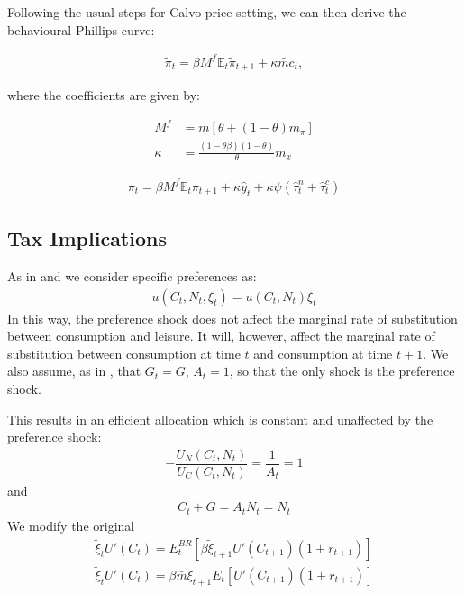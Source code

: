 \documentclass[11pt]{article}
\begin{document}
\begin{spacing}{2}
Following the usual steps for Calvo price-setting, we can then derive the behavioural Phillips curve:

\begin{align}
	\tilde{\pi}_t = \beta M^f \mathbb{E}_t \tilde{\pi}_{t+1} + \kappa \tilde{mc}_t,
\end{align}

where the coefficients are given by:

\begin{align}
	M^f &= m \left[ \theta + (1 - \theta)m_\pi \right]\\
	\kappa &= \frac{(1 - \theta\beta)(1 - \theta)}{\theta} m_x
\end{align}



\begin{align}
	\pi_t = \beta M^f \mathbb{E}_t \pi_{t+1} + \kappa \hat{y}_t + \kappa \psi(\hat{\tau}_{t}^n +\hat{\tau}_{t}^c) 
\end{align}

\subsection{Tax Implications}
As in \cite{eggertsson2011fiscal} and \cite{christiano2011government} we consider specific preferences as:
\begin{align}
	u(C_t, N_t, \xi_t) = u(C_t, N_t)\xi_t
\end{align}
In this way, the preference shock does not affect the marginal rate of substitution between consumption and leisure. It will, however, affect the marginal rate of substitution between consumption at time $t$ and consumption at time $t + 1$. We also assume, as in \cite{correia2013unconventional}, that $G_t = G$, $A_t = 1$, so that the only shock is the preference shock.


This results in an efficient allocation which is constant and unaffected by the preference shock:
\begin{align}
	- \dfrac{U_N(C_t,N_t)}{U_C(C_t,N_t)} = \dfrac{1}{A_t} = 1
\end{align}
and
\begin{align}
	C_t + G = A_tN_t = N_t
\end{align}
We modify the original 
\begin{align}
	\tilde{\xi}_t U'(C_t) = E_t^{BR}\left[\beta \tilde{\xi}_{t+1} U'(C_{t+1}) (1 + r_{t+1})\right]\\
	\tilde{\xi}_t U'(C_t) = \beta \bar{m} {\xi}_{t+1}E_t\left[ U'(C_{t+1}) (1 + r_{t+1})\right]
\end{align}



\end{spacing}
\end{document}
